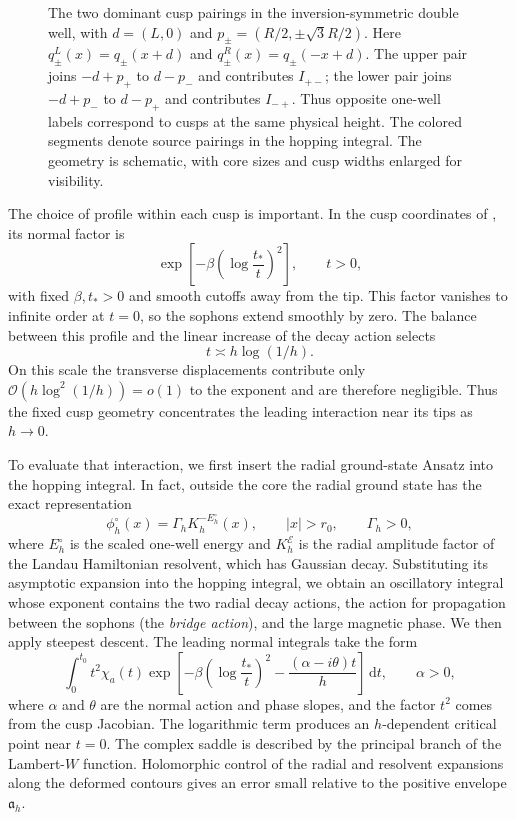 \documentclass[11pt]{article}
\newcommand{\dd}{\,\mathrm d}
\newcommand{\cE}{\mathcal E}
\newcommand{\cO}{\mathcal O}
\begin{document}
\begin{figure}[t]
\caption{The two dominant cusp pairings in the inversion-symmetric
double well, with $d=(L,0)$ and $p_\pm=(R/2,\pm\sqrt{3}R/2)$.
Here $q_\pm^L(x)=q_\pm(x+d)$ and $q_\pm^R(x)=q_\pm(-x+d)$.
The upper pair joins $-d+p_+$ to $d-p_-$ and contributes $I_{+-}$;
the lower pair joins $-d+p_-$ to $d-p_+$ and contributes $I_{-+}$.
Thus opposite one-well labels correspond to cusps at the same physical
height. The colored segments denote source pairings in the hopping
integral. The geometry is schematic, with core sizes and cusp widths
enlarged for visibility.}
\label{fig:dominant-cusp-pairings}
\end{figure}

The choice of profile within each cusp is important. In the cusp
coordinates of , its normal factor is
\[
 \exp\!\left[-\beta\left(\log\frac{t_*}{t}\right)^2\right],
 \qquad t>0,
\]
with fixed $\beta,t_*>0$ and smooth cutoffs away from the tip. This factor
vanishes to infinite order at $t=0$, so the sophons extend smoothly by zero.
The balance between this profile and the linear increase of the decay
action selects
\[
 t\asymp h\log(1/h).
\]
On this scale the transverse displacements contribute only
$\cO(h\log^2(1/h))=o(1)$ to the exponent and are therefore negligible.
Thus the fixed cusp geometry concentrates the leading interaction near
its tips as $h\to0$.

To evaluate that interaction, we first insert the radial ground-state
Ansatz into the hopping integral. In fact, outside the core the radial
ground state has the exact representation
\[
 \phi_h^\circ(x)=\Gamma_h K_h^{-E_h^\circ}(x),
 \qquad |x|>r_0,
 \qquad \Gamma_h>0,
\]
where $E_h^\circ$ is the scaled one-well energy and $K_h^\cE$ is the radial
amplitude factor of the Landau Hamiltonian resolvent, which has Gaussian
decay. Substituting its asymptotic expansion into the hopping integral,
we obtain an oscillatory integral whose exponent contains the two radial
decay actions, the action for propagation between the sophons (the
\emph{bridge action}), and the large magnetic phase. We then apply
steepest descent. The leading normal integrals take the form
\[
 \int_0^{t_0}t^2\chi_a(t)
 \exp\!\left[
 -\beta\left(\log\frac{t_*}{t}\right)^2
 -\frac{(\alpha-i\theta)t}{h}
 \right]\dd t,
 \qquad \alpha>0,
\]
where $\alpha$ and $\theta$ are the normal action and phase slopes, and the
factor $t^2$ comes from the cusp Jacobian. The logarithmic term produces
an $h$-dependent critical point near $t=0$. The complex saddle is described
by the principal branch of the Lambert-$W$ function. Holomorphic control
of the radial and resolvent expansions along the deformed contours gives
an error small relative to the positive envelope $\mathfrak a_h$.
\end{document}
